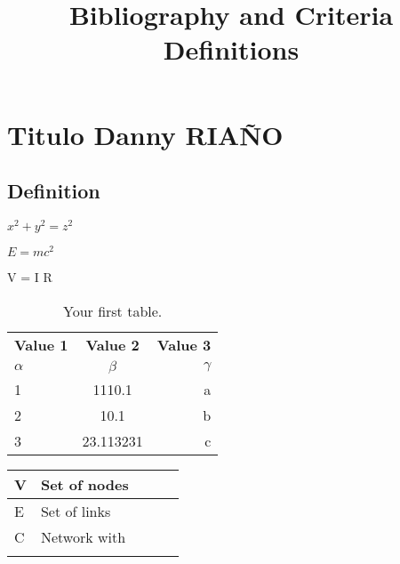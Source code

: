 \documentclass[a4paper,10pt]{article}
\title{Bibliography and Criteria Definitions}
\author{}
\begin{document}
\maketitle

\section{Titulo Danny RIAÑO}
\subsection{Definition}


\(x^2 + y^2 = z^2\)


$E=mc^2$


V = I R

\begin{table}[h!]
  \begin{center}
    \caption{Your first table.}
    \label{tab:table1}
    \begin{tabular}{l|c|r} %
      \textbf{Value 1} & \textbf{Value 2} & \textbf{Value 3}\\
      $\alpha$ & $\beta$ & $\gamma$ \\
      \hline
      1 & 1110.1 & a\\
      2 & 10.1 & b\\
      3 & 23.113231 & c\\
    \end{tabular}
  \end{center}
\end{table}


\begin{table}[]
\begin{tabular}{@{}lllll@{}}
\toprule
V                       & Set of nodes                      &  &  &  \\ \midrule
\multicolumn{1}{|l|}{E} & \multicolumn{1}{l|}{Set of links} &  &  &  \\ \cmidrule(r){1-2}
\multicolumn{1}{|l|}{C} & \multicolumn{1}{l|}{Network with} &  &  &  \\ \cmidrule(r){1-2}
                        &                                   &  &  &  \\ \bottomrule
\end{tabular}
\end{table}




\end{document}
